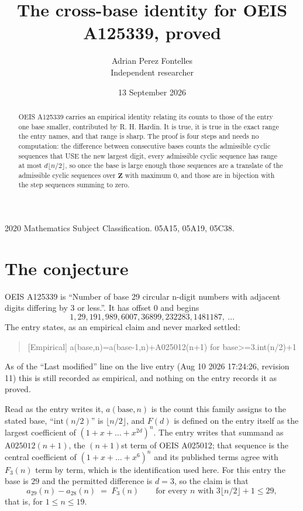 \documentclass[11pt,a4paper]{article}
\title{The cross-base identity for OEIS A125339, proved}
\author{Adrian Perez Fontelles\\ \small Independent researcher}
\date{13 September 2026}
\theoremstyle{plain}
\theoremstyle{definition}
\begin{document}
\maketitle

\begin{abstract}
OEIS A125339 carries an empirical identity relating its counts to those of the entry one base
smaller, contributed by R. H. Hardin. It is true, it is true in the exact range the entry
names, and that range is sharp. The proof is four steps and needs no computation: the
difference between consecutive bases counts the admissible cyclic sequences that USE the new
largest digit, every admissible cyclic sequence has range at most $d\lfloor n/2\rfloor$, so
once the base is large enough those sequences are a translate of the admissible cyclic
sequences over $\mathbf{Z}$ with maximum $0$, and those are in bijection with the step
sequences summing to zero.
\end{abstract}

\noindent\small 2020 Mathematics Subject Classification. 05A15, 05A19, 05C38.\normalsize

\section{The conjecture}

OEIS A125339 is ``Number of base 29 circular n-digit numbers with adjacent digits differing by 3 or less.''. It has offset $0$ and begins
\[
1, 29, 191, 989, 6007, 36899, 232283, 1481187,\ \dots
\]
The entry states, as an empirical claim and never marked settled:
\begin{quote}
[Empirical] a(base,n)=a(base-1,n)+A025012(n+1) for base>=3.int(n/2)+1
\end{quote}
As of the ``Last modified'' line on the live entry (Aug 10 2026 17:24:26, revision 11)
this is still recorded as empirical, and nothing on the entry records it as proved.

Read as the entry writes it, $a(\mathrm{base},n)$ is the count this family assigns to the
stated base, ``$\mathrm{int}(n/2)$'' is $\lfloor n/2\rfloor$, and $F(d)$ is defined on the
entry itself as the largest coefficient of $(1+x+\dots+x^{2d})^{n}$. The entry writes that summand as $\mathrm{A025012}(n+1)$, the $(n+1)$st term of OEIS A025012; that sequence is the central coefficient of $(1+x+\dots+x^{6})^{n}$ and its published terms agree with $F_{3}(n)$ term by term, which is the identification used here. For this entry
the base is $29$ and the permitted difference is $d=3$, so the claim is that
\[
a_{29}(n)-a_{28}(n)\;=\;F_{3}(n)
\qquad\text{for every } n \text{ with } 3\lfloor n/2\rfloor+1\le29,
\]
that is, for $1\le n\le19$.
\end{document}
